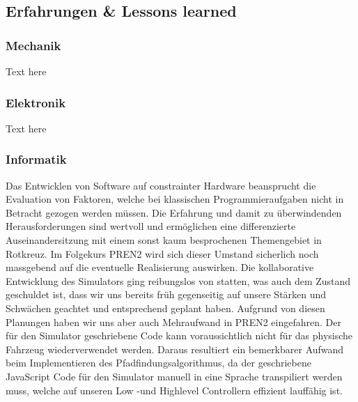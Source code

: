 \documentclass[main.tex]{subfiles} %
\begin{document}
\subsection{Erfahrungen \& Lessons learned}

\subsubsection{Mechanik}
Text here

\subsubsection{Elektronik}
Text here

\subsubsection{Informatik}
Das Entwicklen von Software auf constrainter Hardware beansprucht die
Evaluation von
Faktoren, welche bei klassischen Programmieraufgaben nicht in
Betracht gezogen werden müssen.
Die Erfahrung und damit zu überwindenden Herausforderungen sind
wertvoll und ermöglichen eine differenzierte
Auseinandersitzung mit einem sonst kaum besprochenen Themengebiet in Rotkreuz.
Im Folgekurs PREN2 wird sich dieser Umstand sicherlich noch
massgebend auf die eventuelle Realisierung auswirken.
Die kollaborative Entwicklung des Simulators ging reibungslos von
statten, was auch dem Zustand geschuldet ist, dass wir
uns bereits früh gegenseitig auf unsere Stärken und Schwächen
geachtet und entsprechend geplant haben.
Aufgrund von diesen Planungen haben wir uns aber auch Mehraufwand in
PREN2 eingefahren. Der für den Simulator geschriebene
Code kann voraussichtlich nicht für das physische Fahrzeug
wiederverwendet werden. Daraus resultiert ein bemerkbarer
Aufwand beim Implementieren des Pfadfindungsalgorithmus, da der
geschriebene JavaScript Code für den Simulator manuell in
eine Sprache transpiliert werden muss, welche auf unseren Low -und
Highlevel Controllern effizient lauffähig ist.
\end{document}
